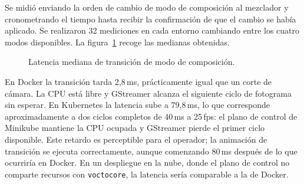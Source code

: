Se midió enviando la orden de cambio de modo de composición al mezclador y
cronometrando el tiempo hasta recibir la confirmación de que el cambio se había
aplicado. Se realizaron 32 mediciones en cada entorno cambiando entre los cuatro
modos disponibles.
La figura~\ref{fig:latencia_transicion} recoge las medianas obtenidas.

\begin{figure}[H]
  \centering
  \caption{Latencia mediana de transición de modo de composición.}
  \label{fig:latencia_transicion}
\end{figure}

En Docker la transición tarda 2{,}8\,ms, prácticamente igual que un corte de
cámara. La CPU está libre y GStreamer alcanza el siguiente ciclo de fotograma
sin esperar. En Kubernetes la latencia sube a 79{,}8\,ms, lo que corresponde aproximadamente a
dos ciclos completos de 40\,ms a 25\,fps: el plano de control de Minikube mantiene la
CPU ocupada y GStreamer pierde el primer ciclo disponible. Este retardo es perceptible para el operador; la animación de transición
se ejecuta correctamente, aunque comenzando 80\,ms después de lo que ocurriría
en Docker. En un despliegue en la nube, donde el plano de control no comparte
recursos con \texttt{voctocore}, la latencia sería comparable a la de Docker.
